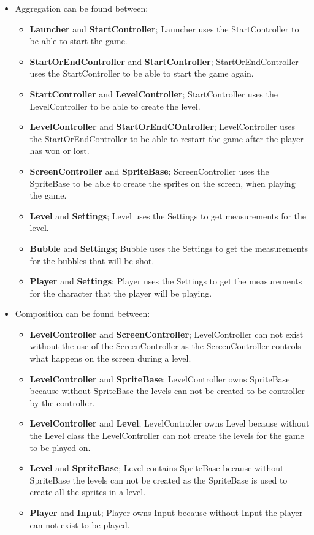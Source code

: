 \begin{itemize}
\itemsep0em 
\item Aggregation can be found between:
	\begin{itemize}
	\itemsep0em
	\item \textbf{Launcher} and \textbf{StartController}; Launcher uses the StartController to be able to start the game.	
	\item \textbf{StartOrEndController} and \textbf{StartController}; StartOrEndController uses the StartController to be able to start the game again.
	\item \textbf{StartController} and \textbf{LevelController}; StartController uses the LevelController to be able to create the level. 
	\item \textbf{LevelController} and \textbf{StartOrEndCOntroller}; LevelController uses the StartOrEndController to be able to restart the game after the player has won or lost.
	\item \textbf{ScreenController} and \textbf{SpriteBase}; ScreenController uses the SpriteBase to be able to create the sprites on the screen, when playing the game.
	\item \textbf{Level} and \textbf{Settings}; Level uses the Settings to get measurements for the level.
	\item \textbf{Bubble} and \textbf{Settings}; Bubble uses the Settings to get the measurements for the bubbles that will be shot. 
	\item \textbf{Player} and \textbf{Settings}; Player uses the Settings to get the measurements for the character that the player will be playing.
	\end{itemize}
\item Composition can be found between:
	\begin{itemize}
	\itemsep0em
	\item \textbf{LevelController} and \textbf{ScreenController}; LevelController can not exist without the use of the ScreenController as the ScreenController controls what happens on the screen during a level.
	\item \textbf{LevelController} and \textbf{SpriteBase}; LevelController owns SpriteBase because without SpriteBase the levels can not be created to be controller by the controller.
	\item \textbf{LevelController} and \textbf{Level}; LevelController owns Level because without the Level class the LevelController can not create the levels for the game to be played on. 
	\item \textbf{Level} and \textbf{SpriteBase}; Level contains SpriteBase because without SpriteBase the levels can not be created as the SpriteBase is used to create all the sprites in a level.
	\item \textbf{Player} and \textbf{Input}; Player owns Input because without Input the player can not exist to be played.
	\end{itemize}
\end{itemize} 
